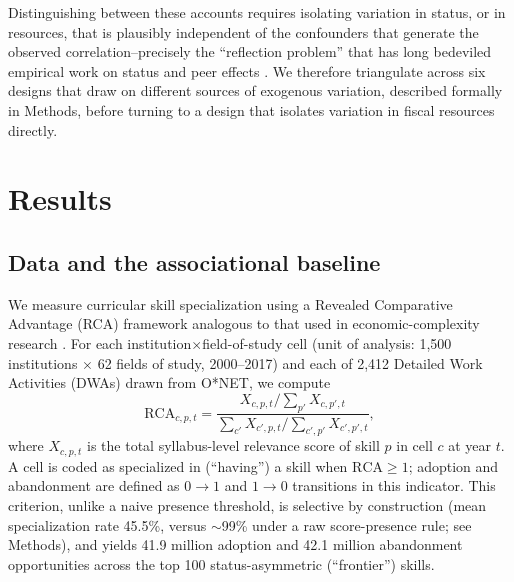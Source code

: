 \documentclass[11pt, letterpaper]{article}
\newcommand{\parencite}[1]{\cite{#1}}
\begin{document}
Distinguishing between these accounts requires isolating variation in status, or in resources, that is plausibly independent of the confounders that generate the observed correlation--precisely the ``reflection problem'' that has long bedeviled empirical work on status and peer effects \parencite{manski1993}. We therefore triangulate across six designs that draw on different sources of exogenous variation, described formally in Methods, before turning to a design that isolates variation in fiscal resources directly.

\section*{Results}

\subsection*{Data and the associational baseline}

We measure curricular skill specialization using a Revealed Comparative Advantage (RCA) framework analogous to that used in economic-complexity research \parencite{balassa1965, hidalgohausmann2009}. For each institution$\times$field-of-study cell (unit of analysis: 1,500 institutions $\times$ 62 fields of study, 2000--2017) and each of 2,412 Detailed Work Activities (DWAs) drawn from O*NET, we compute
$$
\mathrm{RCA}_{c,p,t} = \frac{X_{c,p,t}/\sum_{p'} X_{c,p',t}}{\sum_{c'} X_{c',p,t}/\sum_{c',p'} X_{c',p',t}},
$$
where $X_{c,p,t}$ is the total syllabus-level relevance score of skill $p$ in cell $c$ at year $t$. A cell is coded as specialized in (``having'') a skill when $\mathrm{RCA} \geq 1$; adoption and abandonment are defined as $0\rightarrow1$ and $1\rightarrow0$ transitions in this indicator. This criterion, unlike a naive presence threshold, is selective by construction (mean specialization rate 45.5\%, versus $\sim$99\% under a raw score-presence rule; see Methods), and yields 41.9 million adoption and 42.1 million abandonment opportunities across the top 100 status-asymmetric (``frontier'') skills.

\begin{table}[H]
\centering
\caption{Associational baseline: discrete-time hazard model of frontier-skill adoption and abandonment as a function of exposure and institutional prestige (binary R1 status, Model~1--2; ordinal prestige tier and discipline-level prestige concentration, in the source code's ``gradient'' specification). Standard errors clustered by institution in parentheses.}
\label{tab:main1}

\end{table}
\end{document}
